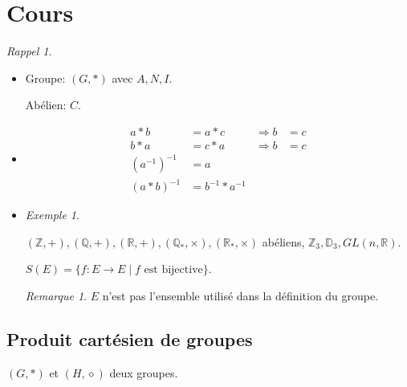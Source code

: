 \documentclass{report}
\newcounter{cours}
\newcommand*{\cours}{\section*{Cours \thecours}\stepcounter{cours}}
\theoremstyle{definition}
\theoremstyle{remark}
\newtheorem*{exem}{Exemple}
\newtheorem*{rema}{Remarque}
\newtheorem*{rappel}{Rappel}
\begin{document}
	\cours
	\begin{rappel}~

		\begin{itemize}
			\item Groupe: $(G, *)$ avec $A, N, I$.

			Ab\'elien: $C$.
			\item
			\begin{align*}
				a*b&=a*c&\Rightarrow b&=c\\
				b*a&=c*a&\Rightarrow b&=c\\
				(a^{-1})^{-1}&= a\\
				(a*b)^{-1}&= b^{-1}*a^{-1}
			\end{align*}
			\item
			\begin{exem}~

				$(\mathbb{Z}, +), (\mathbb{Q}, +), (\mathbb{R}, +), (\mathbb{Q}_*, \times), (\mathbb{R}_*, \times)$ ab\'eliens, $\mathbb{Z}_3, \mathbb{D}_3, GL(n, \mathbb{R})$.

				$S(E)=\{f:E \to E \mid f\text{ est bijective}\}$.
				\begin{rema}
					$E$ n'est pas l'ensemble utilis\'e dans la d\'efinition du groupe.
				\end{rema}
			\end{exem}
		\end{itemize}
	\end{rappel}
	\subsection{Produit cart\'esien de groupes}
	$(G, *)$ et $(H, \diamond)$ deux groupes.
\end{document}
